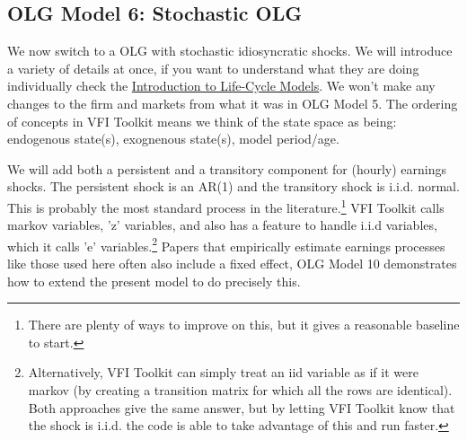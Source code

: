 
\subsection{OLG Model 6: Stochastic OLG}
We now switch to a OLG with stochastic idiosyncratic shocks. We will introduce a variety of details at once, if you want to understand what they are doing individually check the \href{https://www.vfitoolkit.com/updates-blog/2021/an-introduction-to-life-cycle-models/}{Introduction to Life-Cycle Models}. We won't make any changes to the firm and markets from what it was in OLG Model 5. The ordering of concepts in VFI Toolkit means we think of the state space as being: endogenous state(s), exognenous state(s), model period/age.

We will add both a persistent and a transitory component for (hourly) earnings shocks. The persistent shock is an AR(1) and the transitory shock is i.i.d. normal. This is probably the most standard process in the literature.\footnote{There are plenty of ways to improve on this, but it gives a reasonable baseline to start.} VFI Toolkit calls markov variables, 'z' variables, and also has a feature to handle i.i.d variables, which it calls 'e' variables.\footnote{Alternatively, VFI Toolkit can simply treat an iid variable as if it were markov (by creating a transition matrix for which all the rows are identical). Both approaches give the same answer, but by letting VFI Toolkit know that the shock is i.i.d. the code is able to take advantage of this and run faster.} Papers that empirically estimate earnings processes like those used here often also include a fixed effect, OLG Model 10 demonstrates how to extend the present model to do precisely this.

